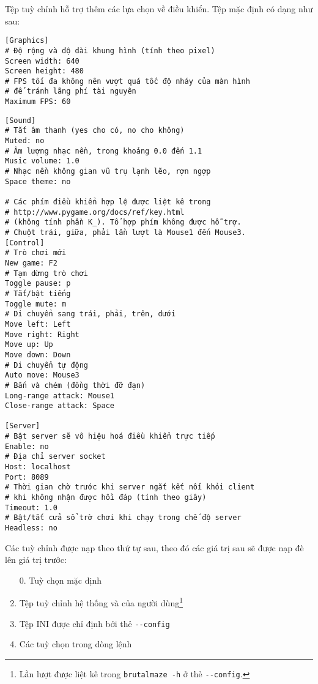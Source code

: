 \documentclass[a4paper,12pt]{article}
\begin{document}
Tệp tuỳ chỉnh hỗ trợ thêm các lựa chọn về điều khiển. Tệp mặc định có dạng như
sau:
\begin{verbatim}
[Graphics]
# Độ rộng và độ dài khung hình (tính theo pixel)
Screen width: 640
Screen height: 480
# FPS tối đa không nên vượt quá tốc độ nháy của màn hình
# để tránh lãng phí tài nguyên
Maximum FPS: 60
\end{verbatim}

\newpage
\begin{verbatim}
[Sound]
# Tắt âm thanh (yes cho có, no cho không)
Muted: no
# Âm lượng nhạc nền, trong khoảng 0.0 đến 1.1
Music volume: 1.0
# Nhạc nền không gian vũ trụ lạnh lẽo, rợn ngợp
Space theme: no

# Các phím điều khiển hợp lệ được liệt kê trong
# http://www.pygame.org/docs/ref/key.html
# (không tính phần K_). Tổ hợp phím không được hỗ trợ.
# Chuột trái, giữa, phải lần lượt là Mouse1 đến Mouse3.
[Control]
# Trò chơi mới
New game: F2
# Tạm dừng trò chơi
Toggle pause: p
# Tắt/bật tiếng
Toggle mute: m
# Di chuyển sang trái, phải, trên, dưới
Move left: Left
Move right: Right
Move up: Up
Move down: Down
# Di chuyển tự động
Auto move: Mouse3
# Bắn và chém (đồng thời đỡ đạn)
Long-range attack: Mouse1
Close-range attack: Space

[Server]
# Bật server sẽ vô hiệu hoá điều khiển trực tiếp
Enable: no
# Địa chỉ server socket
Host: localhost
Port: 8089
# Thời gian chờ trước khi server ngắt kết nối khỏi client
# khi không nhận được hồi đáp (tính theo giây)
Timeout: 1.0
# Bật/tắt cửa sổ trờ chơi khi chạy trong chế độ server
Headless: no
\end{verbatim}

\newpage
Các tuỳ chỉnh được nạp theo thứ tự sau, theo đó các giá trị sau sẽ được nạp đè
lên giá trị trước:
\begin{enumerate}
  \item[0.] Tuỳ chọn mặc định
  \item Tệp tuỳ chỉnh hệ thống và của người dùng\footnote{Lần lượt được liệt kê
    trong \texttt{brutalmaze -h} ở thẻ \texttt{-{}-config}.}
  \item Tệp INI được chỉ định bởi thẻ \verb|--config|
  \item Các tuỳ chọn trong dòng lệnh
\end{enumerate}
\end{document}
